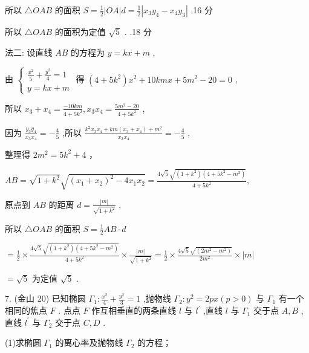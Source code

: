 \documentclass[10pt]{article}
\begin{document}
所以 \(\bigtriangleup {OAB}\) 的面积 \(S = \frac{1}{2}\left| {OA}\right| d = \frac{1}{2}\left| {{x}_{3}{y}_{4} - {x}_{4}{y}_{3}}\right|\) .16 分

所以 \(\bigtriangleup {OAB}\) 的面积为定值 \(\sqrt{5}\) . .18 分

法二: 设直线 \({AB}\) 的方程为 \(y = {kx} + m\) ,

由 \(\left\{  \begin{array}{l} \frac{{x}^{2}}{5} + \frac{{y}^{2}}{4} = 1 \\  y = {kx} + m \end{array}\right.\) 得 \(\left( {4 + 5{k}^{2}}\right) {x}^{2} + {10kmx} + 5{m}^{2} - {20} = 0\) ,

所以 \({x}_{3} + {x}_{4} = \frac{-{10km}}{4 + 5{k}^{2}},{x}_{3}{x}_{4} = \frac{5{m}^{2} - {20}}{4 + 5{k}^{2}}\) ,

因为 \(\frac{{y}_{3}{y}_{4}}{{x}_{3}{x}_{4}} =  - \frac{4}{5}\) ,所以 \(\frac{{k}^{2}{x}_{3}{x}_{4} + {km}\left( {{x}_{3} + {x}_{4}}\right)  + {m}^{2}}{{x}_{3}{x}_{4}} =  - \frac{4}{5}\) ,

整理得 \(2{m}^{2} = 5{k}^{2} + 4\) ，

\({AB} = \sqrt{1 + {k}^{2}}\sqrt{{\left( {x}_{1} + {x}_{2}\right) }^{2} - 4{x}_{1}{x}_{2}} = \frac{4\sqrt{5}\sqrt{\left( {1 + {k}^{2}}\right) \left( {4 + 5{k}^{2} - {m}^{2}}\right) }}{4 + 5{k}^{2}},\)

原点到 \({AB}\) 的距离 \(d = \frac{\left| m\right| }{\sqrt{1 + {k}^{2}}}\) ,

所以 \(\bigtriangleup {OAB}\) 的面积 \(S = \frac{1}{2}{AB} \cdot  d\)

\(= \frac{1}{2} \times  \frac{4\sqrt{5}\sqrt{\left( {1 + {k}^{2}}\right) \left( {4 + 5{k}^{2} - {m}^{2}}\right) }}{4 + 5{k}^{2}} \times  \frac{\left| m\right| }{\sqrt{1 + {k}^{2}}} = \frac{1}{2} \times  \frac{4\sqrt{5}\sqrt{\left( 2{m}^{2} - {m}^{2}\right) }}{2{m}^{2}} \times  \left| m\right|\)

\(= \sqrt{5}\) 为定值 \(\sqrt{5}\) .

7. (金山 20) 已知椭圆 \({\Gamma }_{1} : \frac{{x}^{2}}{4} + \frac{{y}^{2}}{3} = 1\) ,抛物线 \({\Gamma }_{2} : {y}^{2} = {2px}\left( {p > 0}\right)\) 与 \({\Gamma }_{1}\) 有一个相同的焦点 \(F\) . 点点 \(F\) 作互相垂直的两条直线 \(l\) 与 \({l}^{\prime }\) ,直线 \(l\) 与 \({\Gamma }_{1}\) 交于点 \(A,B\) ,直线 \({l}^{\prime }\) 与 \({\Gamma }_{2}\) 交于点 \(C,D\) .

(1)求椭圆 \({\Gamma }_{1}\) 的离心率及抛物线 \({\Gamma }_{2}\) 的方程；
\end{document}
